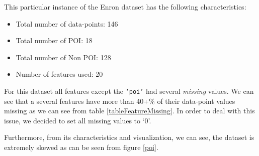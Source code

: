 \documentclass[twoside,openright,titlepage,numbers=noenddot,headinclude,%
               footinclude=true,cleardoublepage=empty,abstractoff,BCOR=5mm,%
               paper=a4,fontsize=11pt,ngerman,american]{scrreprt}
\numberwithin{theorem}{chapter}
\numberwithin{definition}{chapter}
\numberwithin{algorithm}{chapter}
\numberwithin{figure}{chapter}
\numberwithin{table}{chapter}
\numberwithin{equation}{chapter}
\begin{document}
This particular instance of the Enron dataset has the following characteristics:
\begin{itemize}
    \item Total number of data-points: 146
    \item Total number of POI: 18
    \item Total number of Non POI: 128
    \item Number of features used: 20
\end{itemize} 
For this dataset all features except the \texttt{`poi'} had several \textit{missing} values. We can see that a several features have more than 40+\% of their data-point values missing as we can see from table \ref{tableFeatureMissing}. In order to deal with this issue, we decided to set all missing values to `0'. 

Furthermore, from its characteristics and visualization, we can see, the dataset is extremely skewed as can be seen from figure \ref{poi}. 
\end{document}

